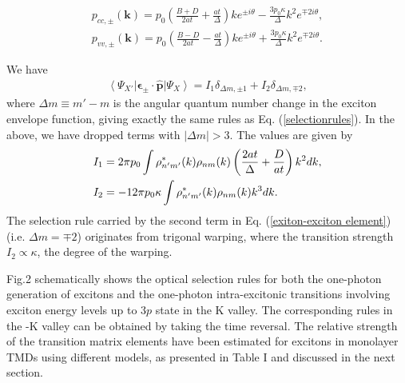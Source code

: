 \documentclass[prb,twocolumn,amsmath,amssymb,superscriptaddress,showpacs]{revtex4}
\begin{document}
\begin{subequations}
\label{intrabandp}
\begin{align}
p_{cc,\pm}(\mathbf{k})=p_{0}\left(\frac{B+D}{2at}+\frac{at}{\Delta}\right)ke^{\pm i\theta}-\frac{3p_{0}\kappa}{\Delta}k^{2}e^{\mp2i\theta}, \label{pcc} \\
p_{vv,\pm}(\mathbf{k})=p_{0}\left(\frac{B-D}{2at}-\frac{at}{\Delta}\right)ke^{\pm i\theta}+\frac{3p_{0}\kappa}{\Delta}k^{2}e^{\mp2i\theta}. \label{pvv}
\end{align}
\end{subequations}

We have
\begin{align}
 \left\langle \Psi_{X'}\right|\mathbf{\epsilon}_{\pm}\cdot\hat{\mathbf{p}}\left|\Psi_{X}\right\rangle =I_{1}\delta_{\Delta m,\pm1}+I_{2}\delta_{\Delta m,\mp2}, \label{exiton-exciton element}
\end{align}
where $\Delta m\equiv m'-m$ is the angular quantum number change in the exciton envelope function, giving exactly the same rules as Eq. (\ref{selectionrules}). In the above, we have dropped terms with $| \Delta m | > 3$. The values are given by
\begin{align}
&I_{1}=2\pi p_0\int\rho_{n'm'}^{*}(k)\rho_{nm}(k)\left(\frac{2at}{\Delta}+\frac{D}{at}\right)k^{2}dk, \notag \\
&I_{2}=-12\pi p_0 \kappa\int\rho_{n'm'}^{*}(k)\rho_{nm}(k)k^{3}dk. \label{intrabanddipole}
\end{align}
The selection rule carried by the second term in Eq. (\ref{exiton-exciton element}) (i.e. $\Delta m=\mp2$) originates from trigonal warping, where the transition strength $I_{2}\propto\kappa$, the degree of the warping.

Fig.2 schematically shows the optical selection rules for both the one-photon generation of excitons and the one-photon intra-excitonic transitions involving exciton energy levels up to $3p$ state in the K valley. The corresponding rules in the -K valley can be obtained by taking the time reversal. The relative strength of the transition matrix elements have been estimated for excitons in monolayer TMDs using different models, as presented in Table I and discussed in the next section.
\end{document}
